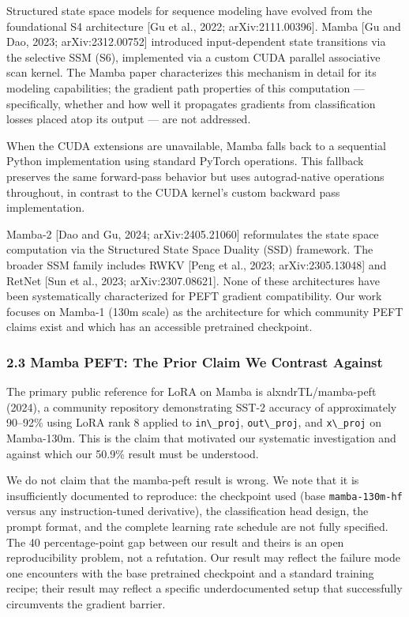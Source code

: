 Structured state space models for sequence modeling have evolved from the foundational S4 architecture [Gu et al., 2022; arXiv:2111.00396]. Mamba [Gu and Dao, 2023; arXiv:2312.00752] introduced input-dependent state transitions via the selective SSM (S6), implemented via a custom CUDA parallel associative scan kernel. The Mamba paper characterizes this mechanism in detail for its modeling capabilities; the gradient path properties of this computation --- specifically, whether and how well it propagates gradients from classification losses placed atop its output --- are not addressed.

When the CUDA extensions are unavailable, Mamba falls back to a sequential Python implementation using standard PyTorch operations. This fallback preserves the same forward-pass behavior but uses autograd-native operations throughout, in contrast to the CUDA kernel's custom backward pass implementation.

Mamba-2 [Dao and Gu, 2024; arXiv:2405.21060] reformulates the state space computation via the Structured State Space Duality (SSD) framework. The broader SSM family includes RWKV [Peng et al., 2023; arXiv:2305.13048] and RetNet [Sun et al., 2023; arXiv:2307.08621]. None of these architectures have been systematically characterized for PEFT gradient compatibility. Our work focuses on Mamba-1 (130m scale) as the architecture for which community PEFT claims exist and which has an accessible pretrained checkpoint.

\subsubsection{2.3 Mamba PEFT: The Prior Claim We Contrast Against}

The primary public reference for LoRA on Mamba is alxndrTL/mamba-peft (2024), a community repository demonstrating SST-2 accuracy of approximately 90--92\% using LoRA rank 8 applied to \texttt{in\textbackslash \_proj}, \texttt{out\textbackslash \_proj}, and \texttt{x\textbackslash \_proj} on Mamba-130m. This is the claim that motivated our systematic investigation and against which our 50.9\% result must be understood.

We do not claim that the mamba-peft result is wrong. We note that it is insufficiently documented to reproduce: the checkpoint used (base \texttt{mamba-130m-hf} versus any instruction-tuned derivative), the classification head design, the prompt format, and the complete learning rate schedule are not fully specified. The 40 percentage-point gap between our result and theirs is an open reproducibility problem, not a refutation. Our result may reflect the failure mode one encounters with the base pretrained checkpoint and a standard training recipe; their result may reflect a specific underdocumented setup that successfully circumvents the gradient barrier.

